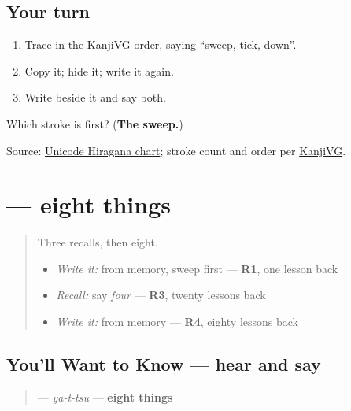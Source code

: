 \subsection*{Your turn}
\begin{enumerate}
\raggedright
  \item Trace \textbf{} in the KanjiVG order, saying \textquotedblleft{}sweep, tick, down\textquotedblright{}.
  \item Copy it; hide it; write it again.
  \item Write \textbf{} beside it and say both.
\end{enumerate}

\begin{tcolorbox}[breakable,colback=teal!4,colframe=teal!35!black,title={Before you move on}]
Which stroke is first? (\textbf{The sweep.})

Source: \href{https://www.unicode.org/charts/PDF/U3040.pdf}{Unicode Hiragana chart}; stroke count and order per \href{https://kanjivg.tagaini.net/kanjivg/kanji/03084.html}{KanjiVG}.
\end{tcolorbox}
\section[\texorpdfstring{\ja{やっつ} (yattsu)}{やっつ (yattsu)}]{ — eight things}

\label{lesson:JA-C17-yattsu}



\begin{quote}
Three recalls, then eight.

\begin{itemize}
\raggedright
  \item \emph{Write it:} \textbf{} from memory, sweep first — \textbf{R1}, one lesson back
  \item \emph{Recall:} say \emph{four} — \textbf{R3}, twenty lessons back
  \item \emph{Write it:} \textbf{} from memory — \textbf{R4}, eighty lessons back
\end{itemize}
\end{quote}

\subsection*{You'll Want to Know — hear and say}
\begin{quote}
\textbf{} — \emph{ya-t-tsu} — \textbf{eight things}
\end{quote}

